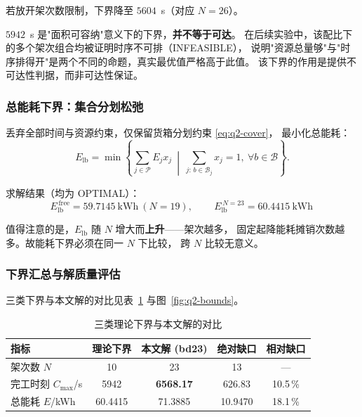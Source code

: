 若放开架次数限制，下界降至 $5604$~s（对应 $N=26$）。

\begin{remark}
$5942$~s 是"面积可容纳"意义下的下界，\textbf{并不等于可达}。
在后续实验中，该配比下的多个架次组合均被证明时序不可排（INFEASIBLE），
说明"资源总量够"与"时序排得开"是两个不同的命题，真实最优值严格高于此值。
该下界的作用是提供不可达性判据，而非可达性保证。
\end{remark}

\subsubsection{总能耗下界：集合分划松弛}

丢弃全部时间与资源约束，仅保留货箱分划约束 \eqref{eq:q2-cover}，
最小化总能耗：
\begin{equation}
  E_{\mathrm{lb}}=\min\left\{
    \sum_{j\in\mathcal{P}} E_j x_j
    \ \middle|\
    \sum_{j:\,b\in\mathcal{B}_j} x_j=1,\ \forall b\in\mathcal{B}
  \right\}.
\end{equation}

求解结果（均为 OPTIMAL）：
\begin{equation}
  E_{\mathrm{lb}}^{\,\mathrm{free}}=59.7145~\mathrm{kWh}\ (N=19),
  \qquad
  \boxed{\,E_{\mathrm{lb}}^{\,N=23}=60.4415~\mathrm{kWh}\,}
\end{equation}

值得注意的是，$E_{\mathrm{lb}}$ 随 $N$ 增大而\textbf{上升}——架次越多，
固定起降能耗摊销次数越多。故能耗下界必须在同一 $N$ 下比较，
跨 $N$ 比较无意义。

\subsubsection{下界汇总与解质量评估}

三类下界与本文解的对比见表~\ref{tab:q2-bounds} 与图~\ref{fig:q2-bounds}。

\begin{table}[htbp]
  \centering
  \caption{三类理论下界与本文解的对比}
  \label{tab:q2-bounds}
  \begin{tabular}{lcccc}
    \toprule
    指标 & 理论下界 & 本文解 (bd23) & 绝对缺口 & 相对缺口 \\
    \midrule
    架次数 $N$            & 10      & 23       & 13      & --- \\
    完工时刻 $C_{\max}$/s & 5942    & \textbf{6568.17} & 626.83 & 10.5\,\% \\
    总能耗 $E$/kWh        & 60.4415 & 71.3885  & 10.9470 & 18.1\,\% \\
    \bottomrule
  \end{tabular}
\end{table}

